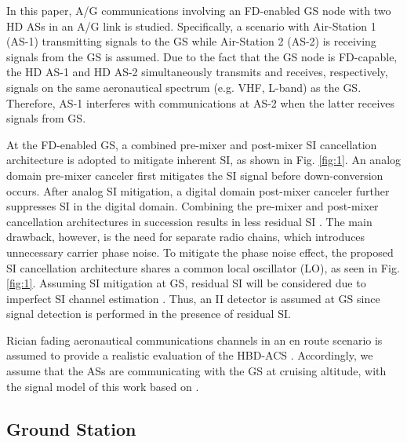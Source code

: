 In this paper, A/G communications involving an FD-enabled GS node with two HD ASs in an A/G link is studied. Specifically, a scenario with Air-Station 1 (AS-1) transmitting signals to the GS while Air-Station 2 (AS-2) is receiving signals from the GS is assumed. Due to the fact that the GS node is FD-capable, the HD AS-1 and HD AS-2 simultaneously transmits and receives, respectively, signals on the same aeronautical spectrum (e.g. VHF, L-band) as the GS. Therefore, AS-1 interferes with communications at AS-2 when the latter receives signals from GS.

At the FD-enabled GS, a combined pre-mixer and post-mixer SI cancellation architecture is adopted to mitigate inherent SI, as shown in Fig. \ref{fig:1}. An analog domain pre-mixer canceler first mitigates the SI signal before down-conversion occurs. After analog SI mitigation, a digital domain post-mixer canceler further suppresses SI in the digital domain. Combining the pre-mixer and post-mixer cancellation architectures in succession results in less residual SI \cite[Table II]{sahai2013impact}. The main drawback, however, is the need for separate radio chains, which introduces unnecessary carrier phase noise. To mitigate the phase noise effect, the proposed SI cancellation architecture shares a common local oscillator (LO), as seen in Fig. \ref{fig:1}. Assuming SI mitigation at GS, residual SI will be considered due to imperfect SI channel estimation \cite{sahai2013impact}. Thus, an II detector is assumed at GS since signal detection is performed in the presence of residual SI.

Rician fading aeronautical communications channels in an en route scenario is assumed to provide a realistic evaluation of the HBD-ACS \cite{haas2002aeronautical}. Accordingly, we assume that the ASs are communicating with the GS at cruising altitude, with the signal model of this work based on \cite{sahai2013impact}.

\subsection{Ground Station}

